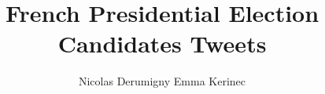 \documentclass[a4paper]{article}
\title{French Presidential Election Candidates Tweets}
\author{Nicolas Derumigny Emma Kerinec \\ }
\begin{document}
\makeatletter
\begin{titlepage}
    \vspace*{\fill}
    \begin{center}
      {\Huge \@title}\\[0.5cm]
      {\Large \@author}\\[0.4cm]
      \@date\\ 
    \end{center}
    \vspace*{\fill}
\end{titlepage}

\begin{abstract}

\end{abstract}
\end{document}
